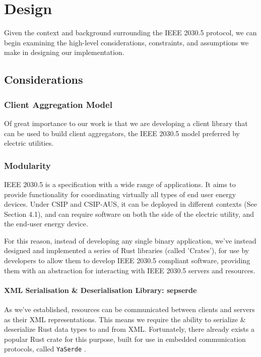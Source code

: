 \chapter{Design}\label{ch:design}
Given the context and background surrounding the IEEE 2030.5 protocol, we can begin examining the high-level considerations, constraints, and assumptions we make in designing our implementation.

\section{Considerations}

\subsection{Client Aggregation Model}
Of great importance to our work is that we are developing a client library that can be used to build client aggregators, the IEEE 2030.5 model preferred by electric utilities.

\subsection{Modularity}
IEEE 2030.5 is a specification with a wide range of applications. It aims to provide functionality for coordinating virtually all types of end user energy devices. Under CSIP and CSIP-AUS, it can be deployed in different contexts (See Section 4.1), and can require software on both the side of the electric utility, and the end-user energy device.

For this reason, instead of developing any single binary application, we've instead designed and implemented a series of Rust libraries (called 'Crates'), for use by developers to allow them to develop IEEE 2030.5 compliant software, providing them with an abstraction for interacting with IEEE 2030.5 servers and resources.

\subsubsection{XML Serialisation \& Deserialisation Library: \- sepserde}
As we've established, resources can be communicated between clients and servers as their XML representations. This means we require the ability to serialize \& deserialize Rust data types to and from XML.
Fortunately, there already exists a popular Rust crate for this purpose, built for use in embedded communication protocols, called \texttt{YaSerde} \cite[]{YaSerde}.

